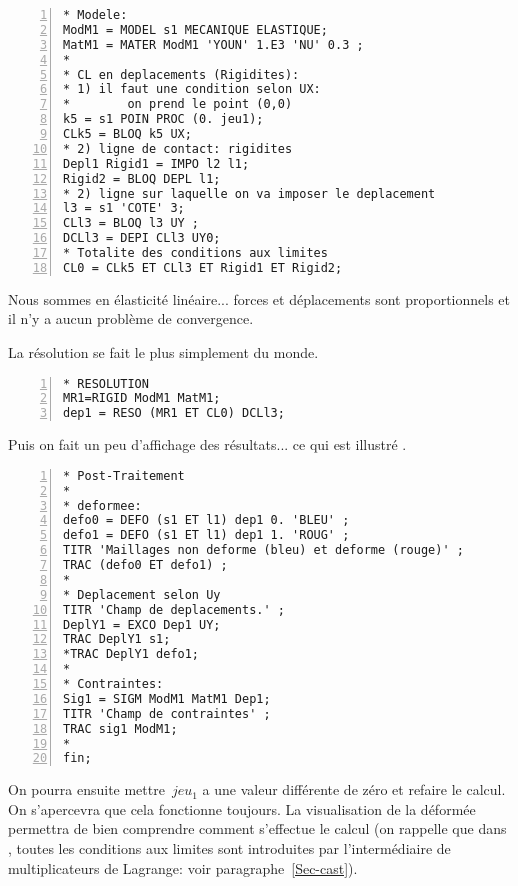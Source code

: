 \color{gris}\scriptsize
\begin{multicols}{2}
\begin{Verbatim}[numbers=left,numbersep=3pt,firstnumber=last]
* Modele:
ModM1 = MODEL s1 MECANIQUE ELASTIQUE;
MatM1 = MATER ModM1 'YOUN' 1.E3 'NU' 0.3 ;
*
* CL en deplacements (Rigidites):
* 1) il faut une condition selon UX: 
*        on prend le point (0,0)
k5 = s1 POIN PROC (0. jeu1);
CLk5 = BLOQ k5 UX;
* 2) ligne de contact: rigidites
Depl1 Rigid1 = IMPO l2 l1;
Rigid2 = BLOQ DEPL l1;
* 2) ligne sur laquelle on va imposer le deplacement
l3 = s1 'COTE' 3;
CLl3 = BLOQ l3 UY ;
DCLl3 = DEPI CLl3 UY0;
* Totalite des conditions aux limites
CL0 = CLk5 ET CLl3 ET Rigid1 ET Rigid2;
\end{Verbatim}
\end{multicols}
\color{black}\normalsize

\medskip
Nous sommes en élasticité linéaire... forces et déplacements sont proportionnels et il n'y a aucun problème de convergence.

La résolution se fait le plus simplement du monde.

\color{gris}\scriptsize
\begin{Verbatim}[numbers=left,numbersep=3pt,firstnumber=last]
* RESOLUTION
MR1=RIGID ModM1 MatM1;
dep1 = RESO (MR1 ET CL0) DCLl3;
\end{Verbatim}
\color{black}\normalsize

\medskip
Puis on fait un peu d'affichage des résultats... ce qui est illustré .

\color{gris}\scriptsize
\begin{multicols}{2}
\begin{Verbatim}[numbers=left,numbersep=3pt,firstnumber=last]
* Post-Traitement
*
* deformee:
defo0 = DEFO (s1 ET l1) dep1 0. 'BLEU' ;
defo1 = DEFO (s1 ET l1) dep1 1. 'ROUG' ;
TITR 'Maillages non deforme (bleu) et deforme (rouge)' ;
TRAC (defo0 ET defo1) ;
*
* Deplacement selon Uy
TITR 'Champ de deplacements.' ;
DeplY1 = EXCO Dep1 UY;
TRAC DeplY1 s1;
*TRAC DeplY1 defo1;
*
* Contraintes:
Sig1 = SIGM ModM1 MatM1 Dep1;
TITR 'Champ de contraintes' ;
TRAC sig1 ModM1;
*
fin;
\end{Verbatim}
\end{multicols}
\color{black}\normalsize

\medskip
On pourra ensuite mettre~$jeu_1$ a une valeur différente de zéro et refaire le calcul. On s'apercevra que cela fonctionne toujours. La visualisation de la déformée permettra de bien comprendre comment s'effectue le calcul (on rappelle que dans \castem, toutes les conditions aux limites sont introduites par l'intermédiaire de multiplicateurs de Lagrange: voir paragraphe~\ref{Sec-cast}).

